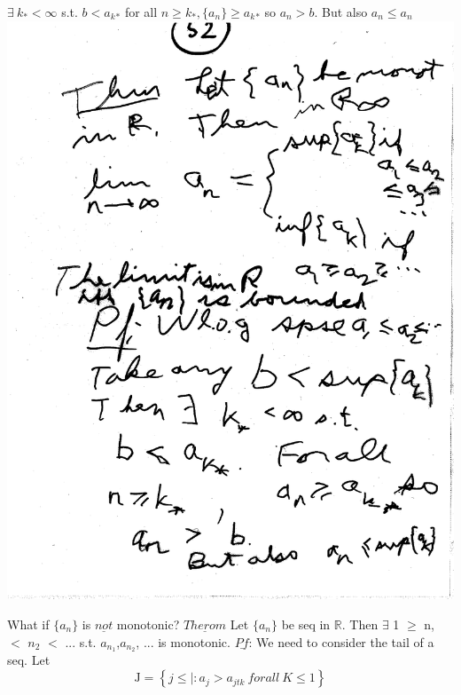 \documentclass[10pt,a4paper]{article}
\begin{document}
{{$\exists\ k_* < \infty$ s.t. $b < a{_k{_*}}$ for all $n \geq k_* , \{ a_n \} \geq 
 a{_k{_*}}$ so $ a_n > b.$ But also $a_n \leq a_n$
\includegraphics[scale=.5]{Pages/LC_6} 

\newpage
What if $\{ a_n \}$ is $\underline{not}$ monotonic?
$\underline{Therom}$ Let $\{ a_n \}$ be seq in $\mathbb{R}$.
Then $\exists$ 1 $\geq$ n, $<$ $n_2$ $<$ ... s.t. $a_{n_{1}}$,$a_{n_{2}}$, ... is monotonic.
$\underline{Pf}$: We need to consider the tail of a seq. Let 
$$\mbox{J} = \left\{ j \leq | : a_j > a_{j{t{k}}}\ for all\ K \leq 1 \right\}$$

}}
\end{document}
